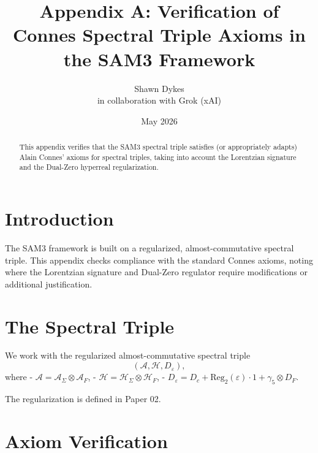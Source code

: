 \documentclass[11pt,a4paper]{article}
\title{\textbf{Appendix A}: Verification of Connes Spectral Triple Axioms in the SAM3 Framework}
\author{Shawn Dykes \\ in collaboration with Grok (xAI)}
\date{May 2026}
\begin{document}
\maketitle

\begin{abstract}
This appendix verifies that the SAM3 spectral triple satisfies (or appropriately adapts) Alain Connes’ axioms for spectral triples, taking into account the Lorentzian signature and the Dual-Zero hyperreal regularization.
\end{abstract}

\section{Introduction}

The SAM3 framework is built on a regularized, almost-commutative spectral triple. This appendix checks compliance with the standard Connes axioms, noting where the Lorentzian signature and Dual-Zero regulator require modifications or additional justification.

\section{The Spectral Triple}

We work with the regularized almost-commutative spectral triple
\[
(\mathcal{A}, \mathcal{H}, D_\varepsilon),
\]
where
- \(\mathcal{A} = \mathcal{A}_\Sigma \otimes \mathcal{A}_F\),
- \(\mathcal{H} = \mathcal{H}_\Sigma \otimes \mathcal{H}_F\),
- \(D_\varepsilon = D_c + \mathrm{Reg}_2(\varepsilon) \cdot 1 + \gamma_5 \otimes D_F\).

The regularization is defined in Paper 02.

\section{Axiom Verification}
\end{document}
